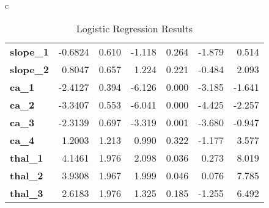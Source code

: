 \begin{table*}[!tp]
{{\begin{tabular}{c}
\begin{tabular*}{\textwidth}{l  @{\extracolsep{\fill}} rrrrrr}
        \textbf{slope\_1}   &      -0.6824  &        0.610     &    -1.118  &         0.264        &       -1.879    &        0.514     \\
        \textbf{slope\_2}   &       0.8047  &        0.657     &     1.224  &         0.221        &       -0.484    &        2.093     \\
        \textbf{ca\_1}      &      -2.4127  &        0.394     &    -6.126  &         0.000        &       -3.185    &       -1.641     \\
        \textbf{ca\_2}      &      -3.3407  &        0.553     &    -6.041  &         0.000        &       -4.425    &       -2.257     \\
        \textbf{ca\_3}      &      -2.3139  &        0.697     &    -3.319  &         0.001        &       -3.680    &       -0.947     \\
        \textbf{ca\_4}      &       1.2003  &        1.213     &     0.990  &         0.322        &       -1.177    &        3.577     \\
        \textbf{thal\_1}    &       4.1461  &        1.976     &     2.098  &         0.036        &        0.273    &        8.019     \\
        \textbf{thal\_2}    &       3.9308  &        1.967     &     1.999  &         0.046        &        0.076    &        7.785     \\
        \textbf{thal\_3}    &       2.6183  &        1.976     &     1.325  &         0.185        &       -1.255    &        6.492     \\
        \end{tabular*}  \\
        \bottomrule
        \end{tabular}
    }
}

\caption{Logistic Regression Results}\label{tab:logit-regression}
\end{table*}

